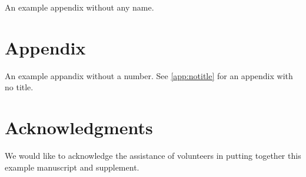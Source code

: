 \documentclass[review]{siamart}
\begin{document}
\appendixnotitle \label{app:notitle}
An example appendix without any name.

\section*{Appendix}
An example appandix without a number.
See \cref{app:notitle} for an appendix with no title.

\section*{Acknowledgments}
We would like to acknowledge the assistance of volunteers in putting
together this example manuscript and supplement.



\end{document}
